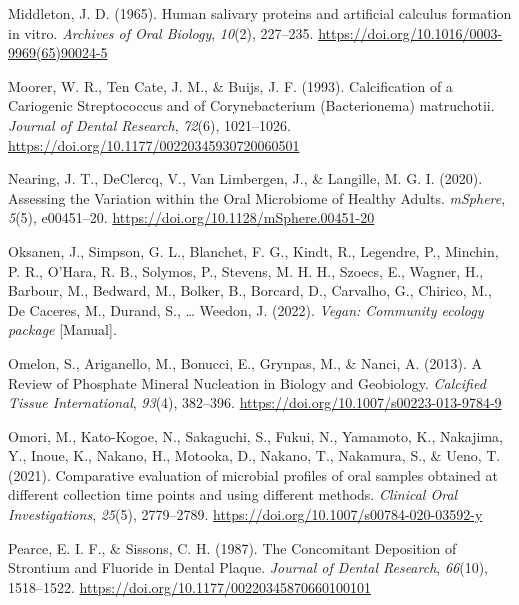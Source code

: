 \documentclass[
  b5paper,
]{book}
\newlength{\cslhangindent}
\newlength{\cslentryspacingunit} %
\newenvironment{CSLReferences}[2] %
 {%
  \setlength{\parindent}{0pt}
  \ifodd #1
  \let\oldpar\par
  \def\par{\hangindent=\cslhangindent\oldpar}
  \fi
  \setlength{\parskip}{#2\cslentryspacingunit}
 }%
 {}
\begin{document}
\begin{CSLReferences}{1}{0}
\leavevmode{}%
Middleton, J. D. (1965). Human salivary proteins and artificial calculus
formation in vitro. \emph{Archives of Oral Biology}, \emph{10}(2),
227--235. \url{https://doi.org/10.1016/0003-9969(65)90024-5}

\leavevmode{}%
Moorer, W. R., Ten Cate, J. M., \& Buijs, J. F. (1993). Calcification of
a {Cariogenic Streptococcus} and of {Corynebacterium} ({Bacterionema})
matruchotii. \emph{Journal of Dental Research}, \emph{72}(6),
1021--1026. \url{https://doi.org/10.1177/00220345930720060501}

\leavevmode{}%
Nearing, J. T., DeClercq, V., Van Limbergen, J., \& Langille, M. G. I.
(2020). Assessing the {Variation} within the {Oral Microbiome} of
{Healthy Adults}. \emph{mSphere}, \emph{5}(5), e00451--20.
\url{https://doi.org/10.1128/mSphere.00451-20}

\leavevmode{}%
Oksanen, J., Simpson, G. L., Blanchet, F. G., Kindt, R., Legendre, P.,
Minchin, P. R., O'Hara, R. B., Solymos, P., Stevens, M. H. H., Szoecs,
E., Wagner, H., Barbour, M., Bedward, M., Bolker, B., Borcard, D.,
Carvalho, G., Chirico, M., De Caceres, M., Durand, S., \ldots{} Weedon,
J. (2022). \emph{Vegan: {Community} ecology package} {[}Manual{]}.

\leavevmode{}%
Omelon, S., Ariganello, M., Bonucci, E., Grynpas, M., \& Nanci, A.
(2013). A {Review} of {Phosphate Mineral Nucleation} in {Biology} and
{Geobiology}. \emph{Calcified Tissue International}, \emph{93}(4),
382--396. \url{https://doi.org/10.1007/s00223-013-9784-9}

\leavevmode{}%
Omori, M., Kato-Kogoe, N., Sakaguchi, S., Fukui, N., Yamamoto, K.,
Nakajima, Y., Inoue, K., Nakano, H., Motooka, D., Nakano, T., Nakamura,
S., \& Ueno, T. (2021). Comparative evaluation of microbial profiles of
oral samples obtained at different collection time points and using
different methods. \emph{Clinical Oral Investigations}, \emph{25}(5),
2779--2789. \url{https://doi.org/10.1007/s00784-020-03592-y}

\leavevmode{}%
Pearce, E. I. F., \& Sissons, C. H. (1987). The {Concomitant Deposition}
of {Strontium} and {Fluoride} in {Dental Plaque}. \emph{Journal of
Dental Research}, \emph{66}(10), 1518--1522.
\url{https://doi.org/10.1177/00220345870660100101}


\end{CSLReferences}
\end{document}

